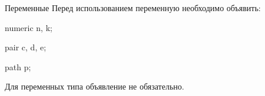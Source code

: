 
\begin{frame}{Переменные}
Перед использованием переменную необходимо объявить:
\begin{programlisting}
numeric n, k;\par
\pause
pair c, d, e;\par
\pause
path p;
\end{programlisting}
\pause

Для переменных типа  объявление не обязательно.
\end{frame}
